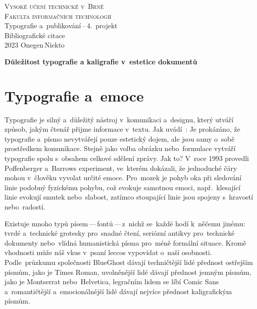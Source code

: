 \documentclass[a4paper, 11pt]{article}
\begin{document}
\begin{titlepage}
	\begin{center}
		{\Huge \textsc{Vysoké učení technické v~Brně}\\}
		{\huge \textsc{Fakulta informačních technologií}\\}
		{\LARGE Typografie a~publikování\,--\,4.\ projekt\\}
		{\Huge Bibliografické citace\\}
		{\Large 2023 \hfill Onegen\,Niekto}
	\end{center}
\end{titlepage}

\begin{center}
	\Large
	\textbf{Důležitost typografie a kaligrafie v~estetice dokumentů}
	\bigskip
\end{center}
\section*{Typografie a~emoce}

Typografie je silný a~důležitý nástroj v~komunikaci a~designu, který utváří
způsob, jakým čtenář přijme informace v~textu.
Jak uvádí~\textcite{Koch:2012:EmotionIT}: 
Je prokázáno, že typografie a~písmo nevytvářejí pouze estetický dojem,
ale jsou samy o~sobě prostředkem komunikace. Stejně jako volba obrázku
nebo~formulace vytváří typografie spolu s~obsahem
celkové sdělení zprávy. \parencite{Pilka:2019:CharakterPisma}
Jak to? V~roce 1993 provedli Poffenberger a~Barrows experiment,
ve~kterém dokázali, že jednoduché čáry mohou v~člověku vyvolat určité emoce.
Pro~mozek je pohyb oka při sledování linie podobný fyzickému pohybu,
což evokuje samotnou emoci, např.~klesající linie evokují smutek nebo~slabost,
zatímco stoupající linie jsou spojeny s~hravostí nebo~radostí.
\parencite{Sladovnikova:2021:EmoceTextu}

Existuje mnoho typů písem\,---\,fontů\,---\,z~nichž se~každé hodí k~něčemu
jinému: tvrdé a~technické grotesky pro~snadné čtení, seriózní antikvy
pro~technické dokumenty nebo~vlídná humanistická písma pro~méně formální situace.
\parencite{Samara:2010:ZakladyDesignu}
Kromě vhodnosti může náš vkus v~psaní leccos vypovídat o~naší osobnosti.
Podle~průzkumu společnosti BlueGhost dávají techničtější lidé přednost ostřejším
písmům, jako je Times Roman, uvolněnější lidé dávají přednost jemným písmům,
jako je Montserrat nebo~Helvetica, legračním lidem se líbí Comic Sans
a~romantičtější a~emocionálnější lidé dávají nejvíce přednost kaligrafickým
písmům. \parencite{Pilka:2019:CharakterPisma}
\end{document}
